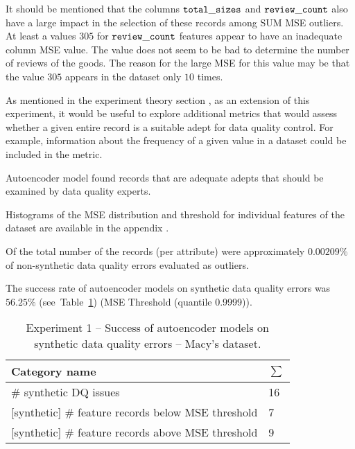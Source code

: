 					
					It should be mentioned that the columns ${\operatorname{\mathtt{total\_sizes}}}$ and ${\operatorname{\mathtt{review\_count}}}$ also have a large impact in the selection of these records among SUM MSE outliers. At least a values $305$ for ${\operatorname{\mathtt{review\_count}}}$ features appear to have an inadequate column MSE value. The value does not seem to be bad to determine the number of reviews of the goods. The reason for the large MSE for this value may be that the value $305$ appears in the dataset only $10$ times.
						
					As mentioned in the experiment theory section , as an extension of this experiment, it would be useful to explore additional metrics that would assess whether a given entire record is a suitable adept for data quality control. For example, information about the frequency of a given value in a dataset could be included in the metric.						
																						
					Autoencoder model found records that are adequate adepts that should be examined by data quality experts.
					
					Histograms of the MSE distribution and threshold for individual features of the dataset are available in the appendix .	
								
					Of the total number of the records (per attribute) were approximately $0.00209\%$ of non-synthetic data quality errors evaluated as outliers.

					The success rate of autoencoder models on synthetic data quality errors was $56.25\%$ (see~Table~\ref{tab:exp1-autoencoder-macys-synthetic-success}) (MSE Threshold (quantile 0.9999)).
			
\begin{table}[!h]
\caption{Experiment 1 -- Success of autoencoder models on synthetic data quality errors -- Macy's dataset.}\label{tab:exp1-autoencoder-macys-synthetic-success}
\begin{tabular}{|l|l|}
\hline
\textbf{Category name}                                     & \textbf{$\sum$} \\ \hline
\# synthetic DQ issues                            & 16           \\ \hline
{[}synthetic{]} \# feature records below MSE threshold     & 7            \\ \hline
{[}synthetic{]} \# feature records above MSE threshold     & 9            \\ \hline
\end{tabular}
\end{table}


